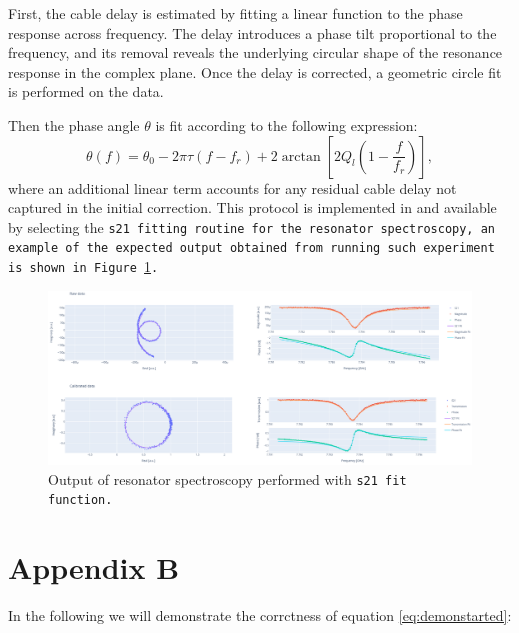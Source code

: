 First, the cable delay is estimated by fitting a linear function to the phase response across frequency. 
The delay introduces a phase tilt proportional to the frequency, and its removal reveals the underlying circular shape of the resonance response in the complex plane. 
Once the delay is corrected, a geometric circle fit is performed on the data.

Then the phase angle $\theta$ is fit according to the following expression:
\begin{equation}
    \theta(f) = \theta_0 - 2\pi \tau (f - f_r) + 2 \arctan \left[ 2 Q_l \left( 1 - \frac{f}{f_r} \right) \right],
\end{equation}
where an additional linear term accounts for any residual cable delay not captured in the initial correction. 
This protocol is implemented in \Qibocal and available by selecting the \tt{s21} fitting routine for the resonator spectroscopy, an example of the expected output obtained from running such experiment is shown in Figure \ref{fig:res_s21}.

\begin{figure}[ht!]
    \centering
    \includegraphics[width=\textwidth]{figures/png/s21.png}
    \caption{Output of resonator spectroscopy performed with \tt{s21} fit function.}
    \label{fig:res_s21}
\end{figure}

\chapter*{Appendix B}
\label{app:AppendixB}

In the following we will demonstrate the corrctness of equation \ref{eq:demonstarted}:

